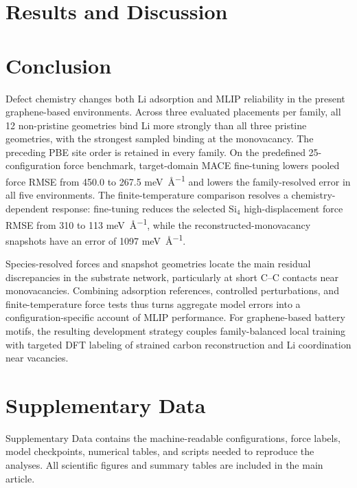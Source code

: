 \documentclass[12pt]{article}
\begin{document}
\section{Results and Discussion}




\section{Conclusion}

Defect chemistry changes both Li adsorption and MLIP reliability in the present
graphene-based environments. Across three evaluated placements per family,
all 12 non-pristine geometries bind Li more strongly than all three
pristine geometries, with the strongest sampled binding at the monovacancy.
The preceding PBE site order is retained in every family. On the predefined 25-configuration force
benchmark, target-domain MACE fine-tuning lowers pooled force RMSE from 450.0
to 267.5 \si{\milli\electronvolt\per\angstrom} and lowers the family-resolved error in all five
environments. The finite-temperature comparison resolves a chemistry-dependent
response: fine-tuning reduces the selected Si$_4$ high-displacement force RMSE
from 310 to 113 \si{\milli\electronvolt\per\angstrom}, while the reconstructed-monovacancy
snapshots have an error of 1097 \si{\milli\electronvolt\per\angstrom}.

Species-resolved forces and snapshot geometries locate the main residual
discrepancies in the substrate network, particularly at short C--C contacts
near monovacancies. Combining adsorption references, controlled perturbations,
and finite-temperature force tests thus turns aggregate model errors into
a configuration-specific account of MLIP performance. For graphene-based
battery motifs, the resulting development strategy couples family-balanced
local training with targeted DFT labeling of strained carbon reconstruction
and Li coordination near vacancies.

\section*{Supplementary Data}

Supplementary Data contains the machine-readable configurations, force labels,
model checkpoints, numerical tables, and scripts needed to reproduce the
analyses. All scientific figures and summary tables are included in the main
article.
\end{document}
